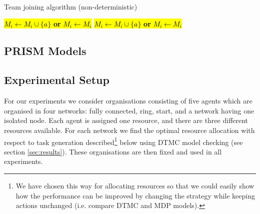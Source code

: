\documentclass{llncs}
\newcommand{\comment}[1]{{\color{red}{[\sf #1]}}}
\begin{document}
\begin{algorithm}[H]
\caption{Team joining algorithm (non-deterministic)}
\label{alg:join_team_nondet}
\begin{scriptsize}
\begin{algorithmic}
     
       
	 
	    \State \hl{$M_i \leftarrow M_i \cup \{a\}$  \textbf{or} $M_i \leftarrow M_i$} 
	\EndIf
       
	 
	  \State \hl{$M_i \leftarrow M_i \cup \{a\}$ \textbf{or} $M_i \leftarrow M_i$} 
	\EndIf
      \EndIf
    \EndIf
  \EndFor
\EndProcedure
\end{algorithmic}
\end{scriptsize}
\end{algorithm}

\subsection{PRISM Models}

\comment{give a small example of PRISM models and explain DTMC, MDP and STPG}

\subsection{Experimental Setup}
\label{subsec:exp_set}
For our experiments we consider organisations consisting of five agents which are organised in four networks: fully connected, ring, start, and a network having one isolated node. Each agent is assigned one resource, and there are three different resources available. For each network we find the optimal resource allocation with respect to task generation described\footnote{We have chosen this way for allocating resources so that we could easily show how the performance can be improved by changing the strategy while keeping actions unchanged (i.e. compare DTMC and MDP models).} below using DTMC model checking (see section \ref{sec:results}). These organisations are then fixed and used in all experiments.
\end{document}
